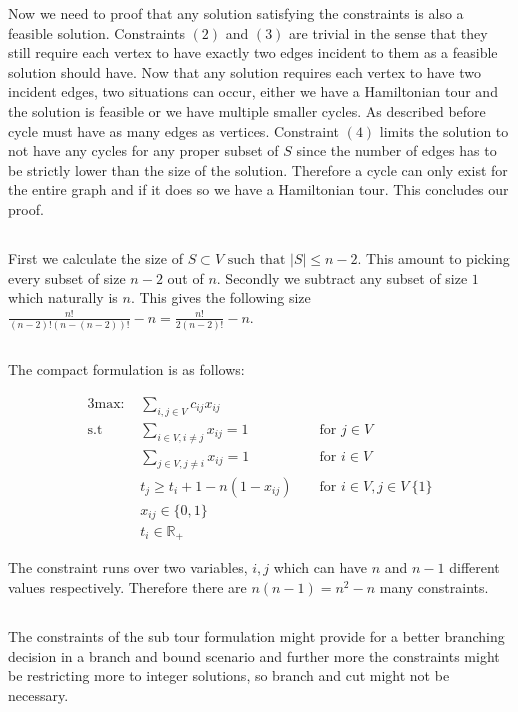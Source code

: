 Now we need to proof that any solution satisfying the constraints is also a feasible solution. Constraints $(2)$ and  $(3)$ are trivial in the sense that they still require each vertex to have exactly two edges incident to them as a feasible solution should have. Now that any solution requires each vertex to have two incident edges, two situations can occur, either we have a Hamiltonian tour and the solution is feasible or we have multiple smaller cycles. As described before cycle must have as many edges as vertices. Constraint $(4)$ limits the solution to not have any cycles for any proper subset of $S$ since the number of edges has to be strictly lower than the size of the solution. Therefore a cycle can only exist for the entire graph and if it does so we have a Hamiltonian tour. This concludes our proof.

\subsection{}
First we calculate the size of $S \subset V \text{ such that } |S| \leq n - 2$. This amount to picking every subset of size $n-2$ out of $n$. Secondly we subtract any subset of size $1$ which naturally is $n$. This gives the following size $\frac{n!}{(n-2)! (n - (n-2))!}-n = \frac{n!}{2 (n-2)!}-n$. 


\subsection{}

The compact formulation is as follows:

\begin{alignat}{3}
	\text{max: }    & \sum_{i,j \in V} c_{ij} x_{ij}\\
	\text{s.t }     & \sum_{i \in V, i \neq j} x_{ij} = 1  && \text{ for } j \in V\\
	& \sum_{j \in V, j \neq i} x_{ij} = 1  && \text{ for } i \in V\\
	& t_j \geq t_i + 1-n(1-x_{ij})  && \text{ for } i \in V, j \in V\ \{1\}\\
	& x_{ij} \in \{0,1\} \\
	& t_i \in \mathbb{R}_+ 
\end{alignat}

The constraint runs over two variables, $i,j$ which can have $n$ and $n-1$ different values respectively. Therefore there are $n(n-1) = n^2-n$ many constraints.

\subsection{}
The constraints of the sub tour formulation might provide for a better branching decision in a branch and bound scenario and further more the constraints might be restricting more to integer solutions, so branch and cut might not be necessary. 


